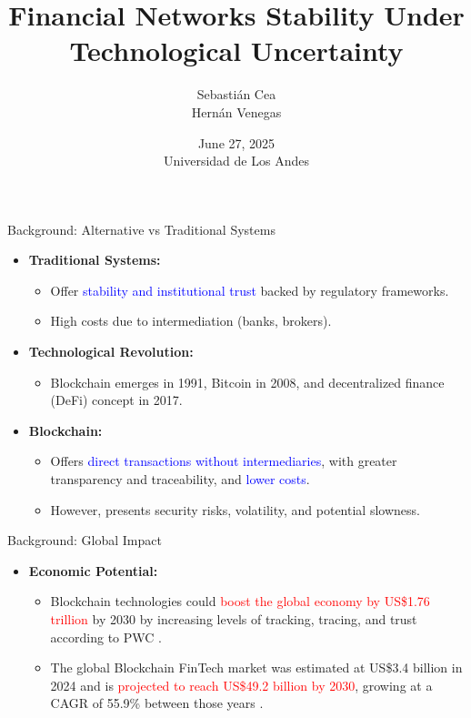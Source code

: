 \documentclass{beamer}
\title{Financial Networks Stability Under Technological Uncertainty}
\author{Sebastián Cea \\ Hernán Venegas}
\date{June 27, 2025 \\ Universidad de Los Andes}
\begin{document}
\frame{\titlepage}

\begin{frame}{Background: Alternative vs Traditional Systems}
\begin{itemize}
    \item \textbf{Traditional Systems:}
    \begin{itemize}
        \item Offer \textcolor{blue}{stability and institutional trust} backed by regulatory frameworks.
        \item High costs due to intermediation (banks, brokers).
    \end{itemize}
    
    \item \textbf{Technological Revolution:}
    \begin{itemize}
        \item Blockchain emerges in 1991, Bitcoin in 2008, and decentralized finance (DeFi) concept in 2017.
    \end{itemize}
    
    \item \textbf{Blockchain:}
    \begin{itemize}
        \item Offers \textcolor{blue}{direct transactions without intermediaries}, with greater transparency and traceability, and \textcolor{blue}{lower costs}.
        \item However, presents security risks, volatility, and potential slowness.
    \end{itemize}
\end{itemize}
\end{frame}


\begin{frame}{Background: Global Impact}
\begin{itemize}
    \item \textbf{Economic Potential:}
    \begin{itemize}
        \item Blockchain technologies could \textcolor{red}{boost the global economy by US\$1.76 trillion} by 2030 by increasing levels of tracking, tracing, and trust according to PWC \cite{pwc2020}.
        \item The global Blockchain FinTech market was estimated at US\$3.4 billion in 2024 and is \textcolor{red}{projected to reach US\$49.2 billion by 2030}, growing at a CAGR of 55.9\% between those years  \cite{market_research_future2024}.
    \end{itemize}
\end{itemize}
\end{frame}
\end{document}
